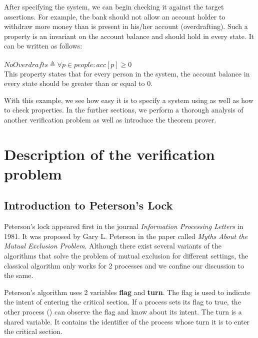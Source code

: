 \documentclass[fleqn]{tukseminar}
\begin{document}
			After specifying the system, we can begin checking it against the target assertions. For example, the bank should not allow an account holder to withdraw more money than is present in his/her account (overdrafting). Such a property is an invariant on the account balance and should hold in every state. It can be written as follows:\\\\
			$NoOverdrafts \triangleq \forall p \in people : acc[p] \geq 0$\\
			
			This property states that for every person in the system, the account balance in every state should be greater than or equal to 0.
			
			With this example, we see how easy it is to specify a system using \tla as well as how to check properties. In the further sections, we perform a thorough analysis of another verification problem as well as introduce the \tla theorem prover.
			
			\section{Description of the verification problem}
			\label{sec:problemdesctiption}
			
			\subsection{Introduction to Peterson's Lock}
			
			Peterson's lock appeared first in the journal \textit{Information Processing Letters } in 1981. It was proposed by Gary L. Peterson in the paper called \textit{Myths About the Mutual Exclusion Problem}\cite{DBLP:journals/ipl/Peterson81}. Although there exist several variants of the algorithms that solve the problem of mutual exclusion for different settings, the classical algorithm only works for 2 processes and we confine our discussion to the same.
			
			Peterson's algorithm uses 2 variables \textbf{flag} and \textbf{turn}. The flag is used to indicate the intent of entering the critical section. If a process \pa sets its flag to true, the other process (\pb) can observe the flag and know about its intent. The turn is a shared variable. It contains the identifier of the process whose turn it is to enter the critical section. 
			
\end{document}
